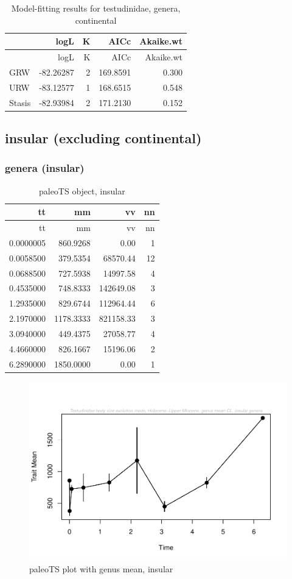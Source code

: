 \documentclass[]{article}
\begin{document}
\begin{longtable}[]{@{}lrrrr@{}}
\caption{Model-fitting results for testudinidae, genera,
continental}\tabularnewline
\toprule
& logL & K & AICc & Akaike.wt\tabularnewline
\midrule
\endfirsthead
\toprule
& logL & K & AICc & Akaike.wt\tabularnewline
\midrule
\endhead
GRW & -82.26287 & 2 & 169.8591 & 0.300\tabularnewline
URW & -83.12577 & 1 & 168.6515 & 0.548\tabularnewline
Stasis & -82.93984 & 2 & 171.2130 & 0.152\tabularnewline
\bottomrule
\end{longtable}

\newpage

\subsection{insular (excluding
continental)}\label{insular-excluding-continental}

\subsubsection{genera (insular)}\label{genera-insular}

\begin{longtable}[]{@{}rrrr@{}}
\caption{paleoTS object, insular}\tabularnewline
\toprule
tt & mm & vv & nn\tabularnewline
\midrule
\endfirsthead
\toprule
tt & mm & vv & nn\tabularnewline
\midrule
\endhead
0.0000005 & 860.9268 & 0.00 & 1\tabularnewline
0.0058500 & 379.5354 & 68570.44 & 12\tabularnewline
0.0688500 & 727.5938 & 14997.58 & 4\tabularnewline
0.4535000 & 748.8333 & 142649.08 & 3\tabularnewline
1.2935000 & 829.6744 & 112964.44 & 6\tabularnewline
2.1970000 & 1178.3333 & 821158.33 & 3\tabularnewline
3.0940000 & 449.4375 & 27058.77 & 4\tabularnewline
4.4660000 & 826.1667 & 15196.06 & 2\tabularnewline
6.2890000 & 1850.0000 & 0.00 & 1\tabularnewline
\bottomrule
\end{longtable}

\begin{figure}[htbp]
\centering
\includegraphics{MA_JJ_files/figure-latex/paleoTSI-1.pdf}
\caption{paleoTS plot with genus mean, insular}
\end{figure}
\end{document}
